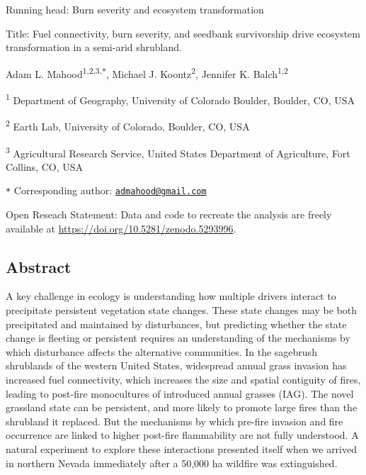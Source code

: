 \documentclass[
  12pt,
]{article}
\author{}
\date{\vspace{-2.5em}}
\begin{document}

Running head: Burn severity and ecosystem transformation

Title: Fuel connectivity, burn severity, and seedbank survivorship drive
ecosystem transformation in a semi-arid shrubland.

Adam L. Mahood\textsuperscript{1,2,3,\texttt{*}}, Michael J.
Koontz\textsuperscript{2}, Jennifer K. Balch\textsuperscript{1,2}

\small

\textsuperscript{1} Department of Geography, University of Colorado
Boulder, Boulder, CO, USA

\textsuperscript{2} Earth Lab, University of Colorado, Boulder, CO, USA

\textsuperscript{3} Agricultural Research Service, United States
Department of Agriculture, Fort Collins, CO, USA

\texttt{*} Corresponding author:
\href{mailto:admahood@gmail.com}{\nolinkurl{admahood@gmail.com}}

\normalsize

Open Reseach Statement: Data and code to recreate the analysis are
freely available at \url{https://doi.org/10.5281/zenodo.5293996}.

\newpage

\linenumbers

\hypertarget{abstract}{%
\subsection{Abstract}\label{abstract}}

A key challenge in ecology is understanding how multiple drivers
interact to precipitate persistent vegetation state changes. These state
changes may be both precipitated and maintained by disturbances, but
predicting whether the state change is fleeting or persistent requires
an understanding of the mechanisms by which disturbance affects the
alternative communities. In the sagebrush shrublands of the western
United States, widespread annual grass invasion has increased fuel
connectivity, which increases the size and spatial contiguity of fires,
leading to post-fire monocultures of introduced annual grasses (IAG).
The novel grassland state can be persistent, and more likely to promote
large fires than the shrubland it replaced. But the mechanisms by which
pre-fire invasion and fire occurrence are linked to higher post-fire
flammability are not fully understood. A natural experiment to explore
these interactions presented itself when we arrived in northern Nevada
immediately after a 50,000 ha wildfire was extinguished.
\end{document}
